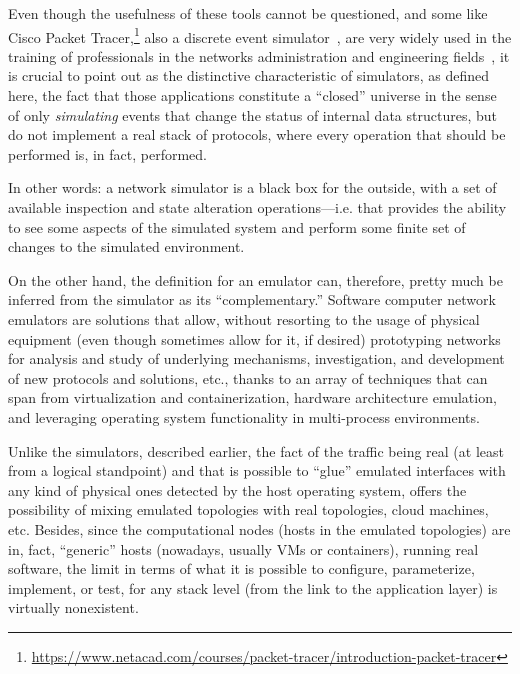 Even though the usefulness of these tools cannot be questioned, and some like Cisco Packet Tracer,\footnote{\url{https://www.netacad.com/courses/packet-tracer/introduction-packet-tracer}} also a discrete event simulator~\cite{evaluatingnetsimmethodologicapproach}, are very widely used in the training of professionals in the networks administration and engineering fields~\cite{rolepackettracer}, it is crucial to point out as the distinctive characteristic of simulators, as defined here, the fact that those applications constitute a ``closed'' universe in the sense of only \emph{simulating} events that change the status of internal data structures, but do not implement a real stack of protocols, where every operation that should be performed is, in fact, performed. %

In other words: a network simulator is a black box for the outside, with a set of available inspection and state alteration operations---i.e. that provides the ability to see some aspects of the simulated system and perform some finite set of changes to the simulated environment.

On the other hand, the definition for an emulator can, therefore, pretty much be inferred from the simulator as its ``complementary.''
Software computer network emulators are solutions that allow, without resorting to the usage of physical equipment (even though sometimes allow for it, if desired) prototyping networks for analysis and study of underlying mechanisms, investigation, and development of new protocols and solutions, etc., thanks to an array of techniques that can span from virtualization and containerization, hardware architecture emulation, and leveraging operating system functionality in multi-process environments.

Unlike the simulators, described earlier, the fact of the traffic being real (at least from a logical standpoint) and that is possible to ``glue'' emulated interfaces with any kind of physical ones detected by the host operating system, offers the possibility of mixing emulated topologies with real topologies, cloud machines, etc.
Besides, since the computational nodes (hosts in the emulated topologies) are in, fact, ``generic'' hosts (nowadays, usually VMs or containers), running real software, the limit in terms of what it is possible to configure, parameterize, implement, or test, for any stack level (from the link to the application layer) is virtually nonexistent.

